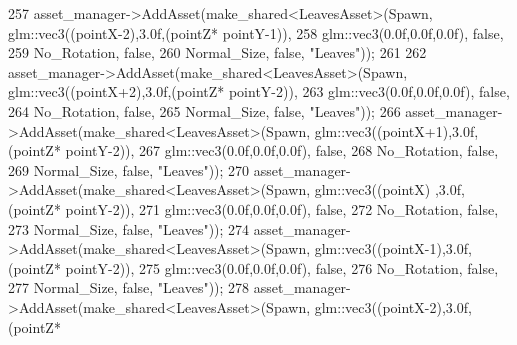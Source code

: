 \begin{DoxyCode}
257             asset\_manager->AddAsset(make\_shared<LeavesAsset>(Spawn, glm::vec3((pointX-2),3.0f,(pointZ*
      pointY-1)),
258                                                              glm::vec3(0.0f,0.0f,0.0f), \textcolor{keyword}{false},
259                                                              No\_Rotation, \textcolor{keyword}{false},
260                                                              Normal\_Size, \textcolor{keyword}{false}, \textcolor{stringliteral}{"Leaves"}));
261 
262             asset\_manager->AddAsset(make\_shared<LeavesAsset>(Spawn, glm::vec3((pointX+2),3.0f,(pointZ*
      pointY-2)),
263                                                              glm::vec3(0.0f,0.0f,0.0f), \textcolor{keyword}{false},
264                                                              No\_Rotation, \textcolor{keyword}{false},
265                                                              Normal\_Size, \textcolor{keyword}{false}, \textcolor{stringliteral}{"Leaves"}));
266             asset\_manager->AddAsset(make\_shared<LeavesAsset>(Spawn, glm::vec3((pointX+1),3.0f,(pointZ*
      pointY-2)),
267                                                              glm::vec3(0.0f,0.0f,0.0f), \textcolor{keyword}{false},
268                                                              No\_Rotation, \textcolor{keyword}{false},
269                                                              Normal\_Size, \textcolor{keyword}{false}, \textcolor{stringliteral}{"Leaves"}));
270             asset\_manager->AddAsset(make\_shared<LeavesAsset>(Spawn, glm::vec3((pointX)  ,3.0f,(pointZ*
      pointY-2)),
271                                                              glm::vec3(0.0f,0.0f,0.0f), \textcolor{keyword}{false},
272                                                              No\_Rotation, \textcolor{keyword}{false},
273                                                              Normal\_Size, \textcolor{keyword}{false}, \textcolor{stringliteral}{"Leaves"}));
274             asset\_manager->AddAsset(make\_shared<LeavesAsset>(Spawn, glm::vec3((pointX-1),3.0f,(pointZ*
      pointY-2)),
275                                                              glm::vec3(0.0f,0.0f,0.0f), \textcolor{keyword}{false},
276                                                              No\_Rotation, \textcolor{keyword}{false},
277                                                              Normal\_Size, \textcolor{keyword}{false}, \textcolor{stringliteral}{"Leaves"}));
278             asset\_manager->AddAsset(make\_shared<LeavesAsset>(Spawn, glm::vec3((pointX-2),3.0f,(pointZ*

\end{DoxyCode}

